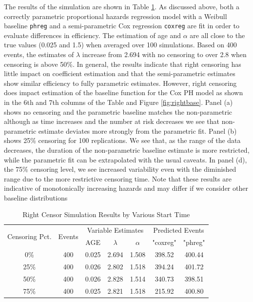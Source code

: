 \documentclass[12pt,letterpaper]{article}
\begin{document}
The results of the simulation are shown in Table \ref{tab:right2}. As discussed above, both a correctly parametric proportional hazards regression model with a Weibull baseline {\tt phreg} and a semi-parametric Cox regression {\tt coxreg} are fit in order to evaluate differences in efficiency. The estimation of age and $\alpha$ are all close to the true values (0.025 and 1.5) when averaged over 100 simulations.  Based on 400 events, the estimates of $\lambda$ increase from 2.694 with no censoring to over 2.8 when censoring is above 50\%.  In general, the results indicate that right censoring has little impact on coefficient estimation and that the semi-parametric estimates show similar efficiency to fully parametric estimates. However, right censoring does impact estimation of the  baseline function for the Cox PH model as shown in the 6th and 7th columns of the Table and Figure \ref{fig:rightbase}.  Panel (a) shows no censoring and the parametric baseline matches the non-parametric although as time increases and the number at risk decreases we see that non-parametric estimate deviates more strongly from the parametric fit.  Panel (b) shows 25\% censoring for 100 replications.  We see that, as the range of the data decreases, the duration of the non-parametric baseline estimate is more restricted, while the parametric fit can be extrapolated with the usual caveats.  In panel (d), the 75\% censoring level, we see increased variability even with the diminished range due to the more restrictive censoring time.  Note that these results are indicative of monotonically increasing hazards and may differ if we consider other baseline distributions
 \begin{table}[htbp]
 	\renewcommand{\arraystretch}{1.5}
 	\centering
 	\caption{Right Censor Simulation Results by Various Start Time}
 	\begin{tabular}{ccccccc}
 		\toprule
 		\multicolumn{1}{c}{\multirow{2}{1.5cm}{Censoring Pct.}}  & \multirow{2}[4]{*}{Events} & \multicolumn{3}{c}{Variable Estimates} & \multicolumn{2}{c}{Predicted Events} \\ \cline{3-7}
 		&       & AGE   & $\lambda$ & $\alpha$ & "coxreg" & "phreg" \\
 		\midrule
 		0\%   & 400   & 0.025 & 2.694 & 1.508 & 398.52 & 400.44 \\
 		25\%  & 400   & 0.026 & 2.802 & 1.518 & 394.24 & 401.72 \\
 		50\%  & 400   & 0.026 & 2.828 & 1.514 & 340.73 & 398.51 \\
 		75\%  & 400   & 0.025 & 2.821 & 1.518 & 215.92 & 400.80 \\
 		\bottomrule
 	\end{tabular}%
 	\label{tab:right2}%
 \end{table}%
\end{document}

